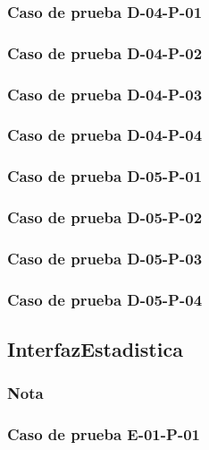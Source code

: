 \documentclass[10pt,a4paper]{article}
\begin{document}
			\subsubsection{Caso de prueba D-04-P-01}

			\subsubsection{Caso de prueba D-04-P-02}

			\subsubsection{Caso de prueba D-04-P-03}

			\subsubsection{Caso de prueba D-04-P-04}

			\subsubsection{Caso de prueba D-05-P-01}

			\subsubsection{Caso de prueba D-05-P-02}

			\subsubsection{Caso de prueba D-05-P-03}

			\subsubsection{Caso de prueba D-05-P-04}

	\subsection{InterfazEstadistica}
			\subsubsection{Nota}

			\subsubsection{Caso de prueba E-01-P-01}
\end{document}
